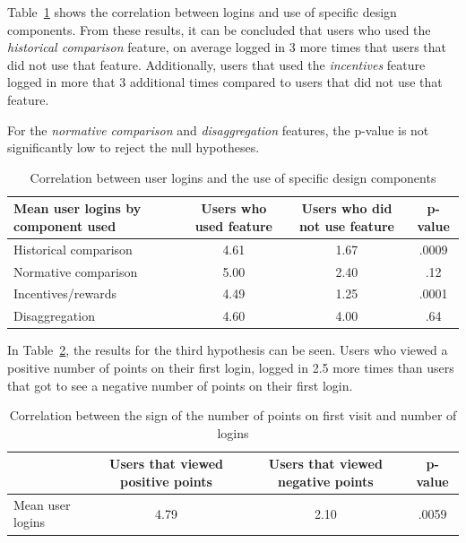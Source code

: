 \documentclass[journal]{vgtc}                %
\begin{document}
Table~\ref{hypo2} shows the correlation between logins and use of specific design components. From these results, it can be concluded that users who used the \textit{historical comparison} feature, on average logged in 3 more times that users that did not use that feature. Additionally, users that used the \textit{incentives} feature logged in more that 3 additional times compared to users that did not use that feature.

For the \textit{normative comparison} and \textit{disaggregation} features, the p-value is not significantly low to reject the null hypotheses. \\

\begin{table}
  \caption{Correlation between user logins and the use of specific design components}
  \label{hypo2}
  \scriptsize
  \begin{center}
    \begin{tabular}{lccc}
    \multicolumn{1}{p{2.5cm}}{\centering Mean user logins by component used} &
       \multicolumn{1}{p{2cm}}{\centering Users who used feature} &
       \multicolumn{1}{p{2cm}}{\centering Users who did not use feature} &
       \multicolumn{1}{p{1cm}}{\centering p-value} \\
    \hline
      Historical comparison &  4.61 & 1.67 & .0009\\
      Normative comparison &  5.00 & 2.40 & .12\\
      Incentives/rewards &  4.49 & 1.25 & .0001\\
      Disaggregation &  4.60 & 4.00 & .64\\

    \end{tabular}
  \end{center}
\end{table}

In Table~\ref{hypo3}, the results for the third hypothesis can be seen. Users who viewed a positive number of points on their first login, logged in 2.5 more times than users that got to see a negative number of points on their first login. \\

\begin{table}
  \caption{Correlation between the sign of the number of points on first visit and number of logins}
  \label{hypo3}
  \scriptsize
  \begin{center}
    \begin{tabular}{lccc}
    \multicolumn{1}{p{2cm}}{\centering } &
       \multicolumn{1}{p{2cm}}{\centering Users that viewed positive points} &
       \multicolumn{1}{p{2cm}}{\centering Users that viewed negative points} &
       \multicolumn{1}{p{1cm}}{\centering p-value} \\
    \hline
      Mean user logins &  4.79 & 2.10 & .0059\\

    \end{tabular}
  \end{center}
\end{table}
\end{document}

